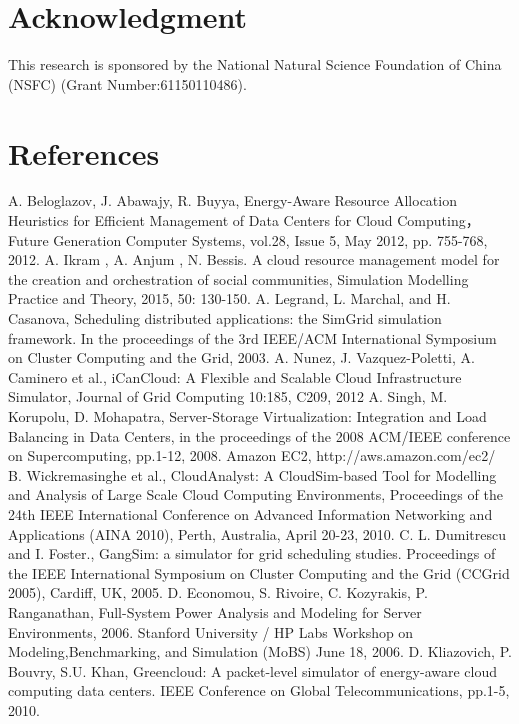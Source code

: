\documentclass[3p, twocolumn]{elsarticle}
\begin{document}
\section*{Acknowledgment}
This research is sponsored by the National Natural Science Foundation of China (NSFC) (Grant Number:61150110486).
\section*{References}
\begin{thebibliography}{99}
A. Beloglazov, J. Abawajy, R. Buyya, Energy-Aware Resource Allocation Heuristics for Efficient Management of Data Centers for Cloud Computing， Future Generation Computer Systems, vol.28, Issue 5, May 2012, pp. 755-768, 2012.
A. Ikram , A. Anjum , N. Bessis. A cloud resource management model for the creation and orchestration of social communities, Simulation Modelling Practice and Theory, 2015, 50: 130-150.
A. Legrand, L. Marchal, and H. Casanova, Scheduling distributed applications: the SimGrid simulation framework. In the proceedings of the 3rd IEEE/ACM International Symposium on Cluster Computing and the Grid, 2003.
A. Nunez, J. Vazquez-Poletti, A. Caminero et al., iCanCloud: A Flexible and Scalable Cloud Infrastructure Simulator, Journal of Grid Computing 10:185, C209, 2012
A. Singh, M. Korupolu, D. Mohapatra, Server-Storage Virtualization: Integration and Load Balancing in Data Centers, in the proceedings of the 2008 ACM/IEEE conference on Supercomputing, pp.1-12, 2008.
Amazon EC2, http://aws.amazon.com/ec2/
B. Wickremasinghe et al., CloudAnalyst: A CloudSim-based Tool for Modelling and Analysis of Large Scale Cloud Computing Environments, Proceedings of the 24th IEEE International Conference on Advanced Information Networking and Applications (AINA 2010), Perth, Australia, April 20-23, 2010.
C. L. Dumitrescu and I. Foster., GangSim: a simulator for grid scheduling studies. Proceedings of the IEEE International Symposium on Cluster Computing and the Grid (CCGrid 2005), Cardiff, UK, 2005.
D. Economou, S. Rivoire, C. Kozyrakis, P. Ranganathan, Full-System Power Analysis and Modeling for Server Environments, 2006. Stanford University / HP Labs Workshop on Modeling,Benchmarking, and Simulation (MoBS) June 18, 2006.
D. Kliazovich, P. Bouvry, S.U. Khan, Greencloud: A packet-level simulator of energy-aware cloud computing data centers. IEEE Conference on Global Telecommunications, pp.1-5, 2010.

\end{thebibliography}
\end{document}
